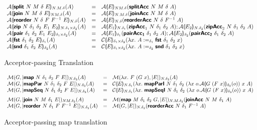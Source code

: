 \begin{figure}[H]
\begin{displaymath}
\begin{array}{lcl}
      \mathcal{A}\llparenthesis \bm{\mathsf{split}}~N~M~\delta~E \rrparenthesis_{N.M.\delta}(A)
      &=& \mathcal{A}\llparenthesis E \rrparenthesis_{NM.\delta}(\bm{\mathsf{splitAcc}}~N~M~\delta~A)
      \\
      \mathcal{A}\llparenthesis \bm{\mathsf{join}}~N~M~\delta~E \rrparenthesis_{NM.\delta}(A)
      &=& \mathcal{A}\llparenthesis E \rrparenthesis_{N.M.\delta}(\bm{\mathsf{joinAcc}}~N~M~\delta~A)
      \\
      \mathcal{A}\llparenthesis \bm{\mathsf{reorder}}~N~\delta~F~F^{-1}~E \rrparenthesis_{N.\delta}(A)
      &=& \mathcal{A}\llparenthesis E \rrparenthesis_{N.\delta}(\bm{\mathsf{reorderAcc}}~N~\delta~F^{-1}~A)
      \\
      \mathcal{A}\llparenthesis \bm{\mathsf{zip}}~N~\delta_1~\delta_2~E_1~E_2 \rrparenthesis_{N.\delta_1\times\delta_2}(A)
      &=& \mathcal{A}\llparenthesis E_1 \rrparenthesis_{N.\delta_1}(\bm{\mathsf{zipAcc}}_1~N~\delta_1~\delta_2~A);
          \mathcal{A}\llparenthesis E_2 \rrparenthesis_{N.\delta_2}(\bm{\mathsf{zipAcc}}_2~N~\delta_1~\delta_2~A)
      \\
      \mathcal{A}\llparenthesis \bm{\mathsf{pair}}~\delta_1~\delta_2~E_1~E_2 \rrparenthesis_{\delta_1\times\delta_2}(A)
      &=& \mathcal{A}\llparenthesis E_1 \rrparenthesis_{\delta_1}(\bm{\mathsf{pairAcc_1}}~\delta_1~\delta_2~A);
          \mathcal{A}\llparenthesis E_2 \rrparenthesis_{\delta_2}(\bm{\mathsf{pairAcc_2}}~\delta_1~\delta_2~A)
      \\
      \mathcal{A}\llparenthesis \bm{\mathsf{fst}}~{\delta_1}~{\delta_2}~E \rrparenthesis_{\delta_1}(A)
      &=& \mathcal{C}\llparenthesis E \rrparenthesis_{\delta_1\times\delta_2}(\lambda x.~A :=_{\delta_1} \bm{\mathsf{fst}}~{\delta_1}~{\delta_2}~x)
      \\
      \mathcal{A}\llparenthesis \bm{\mathsf{snd}}~{\delta_1}~{\delta_2}~E \rrparenthesis_{\delta_2}(A)
      &=& \mathcal{C}\llparenthesis E \rrparenthesis_{\delta_1\times\delta_2}(\lambda x.~A :=_{\delta_2} \bm{\mathsf{snd}}~{\delta_1}~{\delta_2}~x)
    \end{array}
  \end{displaymath}
  \caption{Acceptor-passing Translation}\label{fig:acc-trans}
\end{figure}

\begin{figure}[H]
  \begin{displaymath}
    \begin{array}{lcl}
      \semM{G}{\prim{map}~N~\delta_1~\delta_2~F~E}_{N.\delta_3}(A)
      &=& \semM{\lambda x.~F~(G~x)}{E}_{N.\delta_3}(A) %
      \\
      \semM{G}{\prim{mapPar}~N~\delta_1~\delta_2~F~E}_{N.\delta_3}(A)
      &=& \semE{E}_{N.\delta_1}(\lambda x.~\prim{mapParI}~N~\delta_1~\delta_2~(\lambda x~o. \semA{G~(F~x)}_{\delta_3}(o))~x~A)
      \\
      \semM{G}{\prim{mapSeq}~N~\delta_1~\delta_2~F~E}_{N.\delta_3}(A)
      &=& \semE{E}_{N.\delta_1}(\lambda x.~\prim{mapSeqI}~N~\delta_1~\delta_2~(\lambda x~o. \semA{G~(F~x)}_{\delta_3}(o))~x~A)
      \medskip\\

      \semM{G}{\prim{join}~N~M~\delta_1~E}_{NM.\delta_2}(A)
      &=& \semM{\prim{map}~M~\delta_1~\delta_2~G}{E}_{N.M.\delta_2}(\prim{joinAcc}~N~M~\delta_1~A)
      \\
      \semM{G}{\prim{reorder}~N~\delta_1~F~F^{-1}~E}_{N.\delta_2}(A)
      &=& \semM{G}{E}_{N.\delta_2}(\prim{reorderAcc}~N~\delta_1~F^{-1}~A)
      \\
    \end{array}
  \end{displaymath}
  \caption{Acceptor-passing map translation}\label{fig:map-acc-trans}
\end{figure}

